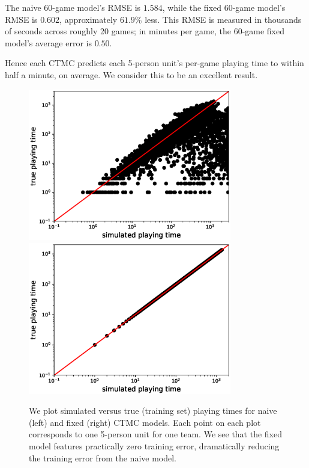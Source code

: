 \documentclass[review,letterpaper,11pt]{elsarticle}
\begin{document}
The naive 60-game model's RMSE is $1.584$, while the fixed 60-game model's RMSE is $0.602$, approximately $61.9\%$ less.  This RMSE is measured in thousands of seconds across roughly 20 games; in minutes per game, the 60-game fixed model's average error is $0.50$. 

Hence each CTMC predicts each 5-person unit's per-game playing time to within half a minute, on average.  We consider this to be an excellent result.


\begin{figure}[tbh]
\centering
\includegraphics[width=3.5in]{plots/results/pergame_allteams_naive.eps}
\includegraphics[width=3.5in]{plots/results/pergame_allteams.eps}
\caption{We plot simulated versus true (training set) playing times for naive (left) and fixed (right) CTMC models.   Each point on each plot corresponds to one 5-person unit for one team.  We see that the fixed model features practically zero training error, dramatically reducing the training error from the naive model.}
\label{fig:fixed_all}
\end{figure}
\end{document}
